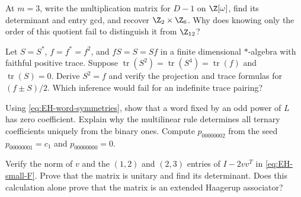 \begin{exercise}\label{ex:noncyclic-smith}
At $m=3$, write the multiplication matrix for $D-1$ on
$\Z[\omega]$, find its determinant and entry gcd, and recover
$\Z_2\times\Z_6$. Why does knowing only the order of this
quotient fail to distinguish it from $\Z_{12}$?

\par\smallskip{}\par
\end{exercise}

\begin{exercise}\label{ex:EH-moment-projections}
Let $S=S^*$, $f=f^*=f^2$, and $fS=S=Sf$ in a finite
dimensional $*$-algebra with faithful positive trace. Suppose
$\operatorname{tr}(S^2)=\operatorname{tr}(S^4)=\operatorname{tr}(f)$
and $\operatorname{tr}(S)=0$. Derive $S^2=f$ and verify the
projection and trace formulas for $(f\pm S)/2$.
Which inference would fail for an indefinite trace pairing?

\par\smallskip{}\par
\end{exercise}

\begin{exercise}\label{ex:EH-word-tensor}
Using \eqref{eq:EH-word-symmetries}, show that a word fixed by
an odd power of $L$ has zero coefficient. Explain why the
multilinear rule determines all ternary coefficients uniquely
from the binary ones. Compute $p_{00000002}$ from the seed
$p_{00000001}=c_1$ and $p_{00000000}=0$.

\par\smallskip{}\par
\end{exercise}

\begin{exercise}\label{ex:EH-reflection-F}
Verify the norm of $v$ and the $(1,2)$ and $(2,3)$ entries of
$I-2vv^T$ in \eqref{eq:EH-small-F}. Prove that the matrix is
unitary and find its determinant. Does this calculation alone
prove that the matrix is an extended Haagerup associator?

\par\smallskip{}\par
\end{exercise}


